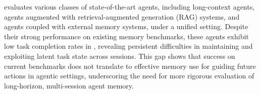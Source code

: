 \ours evaluates various classes of state-of-the-art agents, including long-context agents, agents augmented with retrieval-augmented generation (RAG) systems, and agents coupled with external memory systems, under a unified setting. Despite their strong performance on existing memory benchmarks, these agents exhibit low task completion rates in \ours, revealing persistent difficulties in maintaining and exploiting latent task state across sessions. This gap shows that success on current benchmarks does not translate to effective memory use for guiding future actions in agentic settings, underscoring the need for more rigorous evaluation of long-horizon, multi-session agent memory.


